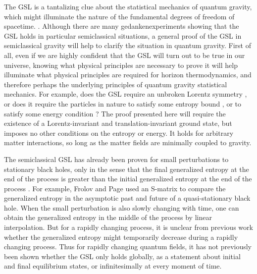 \documentclass[12pt]{article}
\begin{document}
The GSL is a tantalizing clue about the statistical mechanics of quantum gravity, which might illuminate the nature of the fundamental degrees of freedom of spacetime. \cite{sorkin83}\cite{JP07}.  Although there are many gedankenexperiments showing that the GSL holds in particular semiclassical situations, a general proof of the GSL in semiclassical gravity will help to clarify the situation in quantum gravity.  First of all, even if we are highly confident that the GSL will turn out to be true in our universe, knowing what physical principles are necessary to prove it will help illuminate what physical principles are required for horizon thermodynamics, and therefore perhaps the underlying principles of quantum gravity statistical mechanics.  For example, does the GSL require an unbroken Lorentz symmetry \cite{EFJW07}, or does it require the particles in nature to satisfy some entropy bound \cite{bounds}, or to satisfy some energy condition \cite{energy}?  The proof presented here will require the existence of a Lorentz-invariant and translation-invariant ground state, but imposes no other conditions on the entropy or energy.  It holds for arbitrary matter interactions, so long as the matter fields are minimally coupled to gravity.

The semiclassical GSL has already been proven for small perturbations to stationary black holes, only in the sense that the final generalized entropy at the end of the process is greater than the initial generalized entropy at the end of the process \cite{10proofs}.  For example, Frolov and Page \cite{FP93} used an S-matrix to compare the generalized entropy in the asymptotic past and future of a quasi-stationary black hole.  When the small perturbation is also slowly changing with time, one can obtain the generalized entropy in the middle of the process by linear interpolation.  But for a rapidly changing process, it is unclear from previous work whether the generalized entropy might temporarily decrease during a rapidly changing process.  Thus for rapidly changing quantum fields, it has not previously been shown whether the GSL only holds globally, as a statement about initial and final equilibrium states, or infinitesimally at every moment of time.
\end{document}
